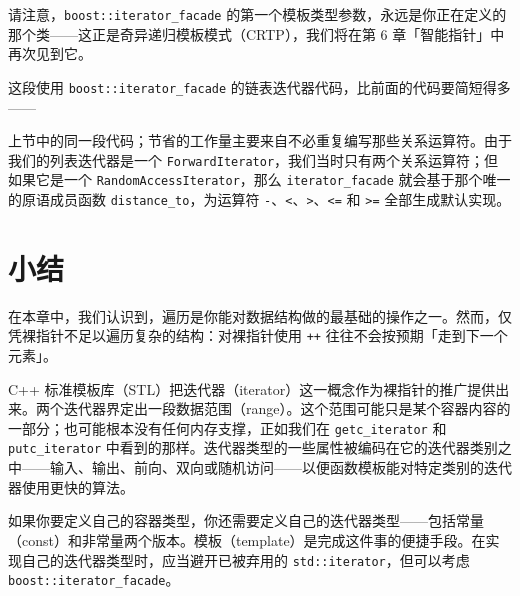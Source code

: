 请注意，\texttt{boost::\allowbreak{}iterator\_\allowbreak{}facade} 的第一个模板类型参数，永远是你正在定义的那个类——这正是奇异递归模板模式（CRTP），我们将在第 6 章「智能指针」中再次见到它。

这段使用 \texttt{boost::\allowbreak{}iterator\_\allowbreak{}facade} 的链表迭代器代码，比前面的代码要简短得多——

上节中的同一段代码；节省的工作量主要来自不必重复编写那些关系运算符。由于我们的列表迭代器是一个 \texttt{Forward\allowbreak{}Iterator}，我们当时只有两个关系运算符；但如果它是一个 \texttt{Random\allowbreak{}Access\allowbreak{}Iterator}，那么 \texttt{iterator\_\allowbreak{}facade} 就会基于那个唯一的原语成员函数 \texttt{distance\_\allowbreak{}to}，为运算符 \texttt{-}、\texttt{<}、\texttt{>}、\texttt{<=} 和 \texttt{>=} 全部生成默认实现。

\section{小结}

在本章中，我们认识到，遍历是你能对数据结构做的最基础的操作之一。然而，仅凭裸指针不足以遍历复杂的结构：对裸指针使用 \texttt{++} 往往不会按预期「走到下一个元素」。

C++ 标准模板库（STL）把迭代器（iterator）这一概念作为裸指针的推广提供出来。两个迭代器界定出一段数据范围（range）。这个范围可能只是某个容器内容的一部分；也可能根本没有任何内存支撑，正如我们在 \texttt{getc\_\allowbreak{}iterator} 和 \texttt{putc\_\allowbreak{}iterator} 中看到的那样。迭代器类型的一些属性被编码在它的迭代器类别之中——输入、输出、前向、双向或随机访问——以便函数模板能对特定类别的迭代器使用更快的算法。

如果你要定义自己的容器类型，你还需要定义自己的迭代器类型——包括常量（const）和非常量两个版本。模板（template）是完成这件事的便捷手段。在实现自己的迭代器类型时，应当避开已被弃用的 \texttt{std::\allowbreak{}iterator}，但可以考虑 \texttt{boost::\allowbreak{}iterator\_\allowbreak{}facade}。
